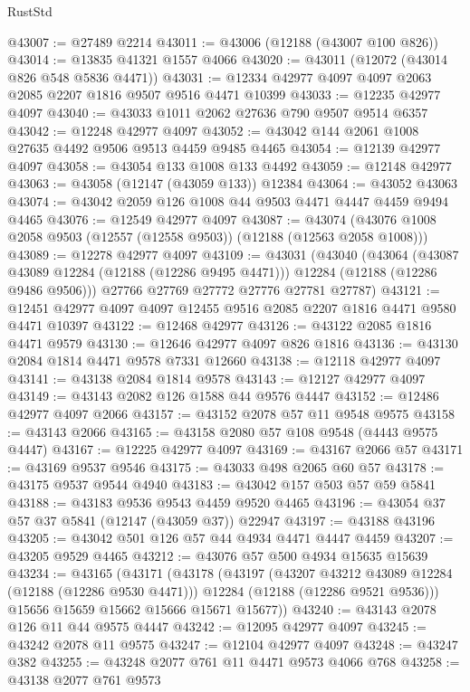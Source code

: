 \begin{lexlean}{RustStd}
\begin{coremodule}
@43007 := @27489 @2214
@43011 := @43006 (@12188 (@43007 @100 @826))
@43014 := @13835 @41321 @1557 @4066
@43020 := @43011 (@12072 (@43014 @826 @548 @5836 @4471))
@43031 := @12334 @42977 @4097 @4097 @2063 @2085 @2207 @1816 @9507 @9516 @4471 @10399
@43033 := @12235 @42977 @4097
@43040 := @43033 @1011 @2062 @27636 @790 @9507 @9514 @6357
@43042 := @12248 @42977 @4097
@43052 := @43042 @144 @2061 @1008 @27635 @4492 @9506 @9513 @4459 @9485 @4465
@43054 := @12139 @42977 @4097
@43058 := @43054 @133 @1008 @133 @4492
@43059 := @12148 @42977
@43063 := @43058 (@12147 (@43059 @133)) @12384
@43064 := @43052 @43063
@43074 := @43042 @2059 @126 @1008 @44 @9503 @4471 @4447 @4459 @9494 @4465
@43076 := @12549 @42977 @4097
@43087 := @43074 (@43076 @1008 @2058 @9503 (@12557 (@12558 @9503)) (@12188 (@12563 @2058 @1008)))
@43089 := @12278 @42977 @4097
@43109 := @43031
    (@43040
      (@43064
        (@43087 @43089 @12284 (@12188 (@12286 @9495 @4471)))
        @12284
        (@12188 (@12286 @9486 @9506)))
      @27766
      @27769
      @27772
      @27776
      @27781
      @27787)
@43121 := @12451 @42977 @4097 @4097 @12455 @9516 @2085 @2207 @1816 @4471 @9580 @4471 @10397
@43122 := @12468 @42977
@43126 := @43122 @2085 @1816 @4471 @9579
@43130 := @12646 @42977 @4097 @826 @1816
@43136 := @43130 @2084 @1814 @4471 @9578 @7331 @12660
@43138 := @12118 @42977 @4097
@43141 := @43138 @2084 @1814 @9578
@43143 := @12127 @42977 @4097
@43149 := @43143 @2082 @126 @1588 @44 @9576 @4447
@43152 := @12486 @42977 @4097 @2066
@43157 := @43152 @2078 @57 @11 @9548 @9575
@43158 := @43143 @2066
@43165 := @43158 @2080 @57 @108 @9548 (@4443 @9575 @4447)
@43167 := @12225 @42977 @4097
@43169 := @43167 @2066 @57
@43171 := @43169 @9537 @9546
@43175 := @43033 @498 @2065 @60 @57
@43178 := @43175 @9537 @9544 @4940
@43183 := @43042 @157 @503 @57 @59 @5841
@43188 := @43183 @9536 @9543 @4459 @9520 @4465
@43196 := @43054 @37 @57 @37 @5841 (@12147 (@43059 @37)) @22947
@43197 := @43188 @43196
@43205 := @43042 @501 @126 @57 @44 @4934 @4471 @4447 @4459
@43207 := @43205 @9529 @4465
@43212 := @43076 @57 @500 @4934 @15635 @15639
@43234 := @43165
    (@43171
      (@43178
        (@43197
          (@43207 @43212 @43089 @12284 (@12188 (@12286 @9530 @4471)))
          @12284
          (@12188 (@12286 @9521 @9536)))
        @15656
        @15659
        @15662
        @15666
        @15671
        @15677))
@43240 := @43143 @2078 @126 @11 @44 @9575 @4447
@43242 := @12095 @42977 @4097
@43245 := @43242 @2078 @11 @9575
@43247 := @12104 @42977 @4097
@43248 := @43247 @382
@43255 := @43248 @2077 @761 @11 @4471 @9573 @4066 @768
@43258 := @43138 @2077 @761 @9573

\end{coremodule}
\end{lexlean}
